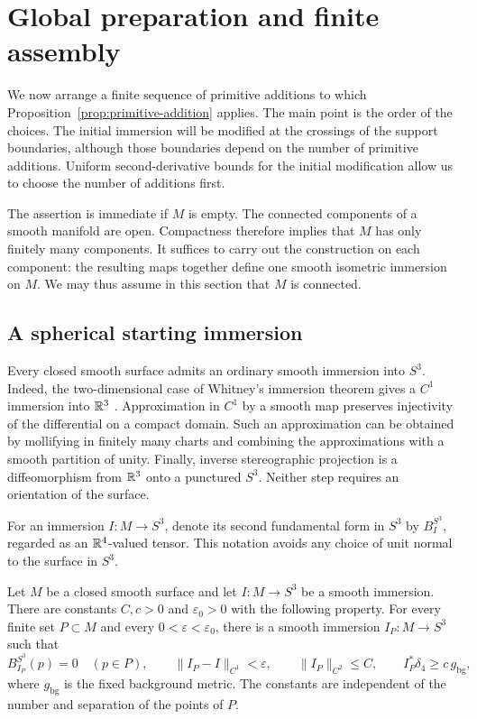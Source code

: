 \section{Global preparation and finite assembly}
\label{sec:global-construction}

We now arrange a finite sequence of primitive additions to which
Proposition~\ref{prop:primitive-addition} applies.  The main point is the order
of the choices.  The initial immersion will be modified at the crossings of
the support boundaries, although those boundaries depend on the number of
primitive additions.  Uniform second-derivative bounds for the initial
modification allow us to choose the number of additions first.

The assertion is immediate if $M$ is empty.  The connected components
of a smooth manifold are open.  Compactness
therefore implies that $M$ has only finitely many components.  It suffices
to carry out the construction on each component: the resulting maps
together define one smooth isometric immersion on $M$.  We may thus
assume in this section that $M$ is connected.

\subsection{A spherical starting immersion}

Every closed smooth surface admits an ordinary smooth immersion into $S^3$.
Indeed, the two-dimensional case of Whitney's immersion theorem gives a
$C^1$ immersion into $\mathbb{R}^3$ \cite[Theorem~8, p.~274]{Whitney1944}.  Approximation in $C^1$ by a
smooth map preserves injectivity of the differential on a compact domain.
Such an approximation can be obtained by mollifying in finitely many charts
and combining the approximations with a smooth partition of unity.  Finally,
inverse stereographic projection is a diffeomorphism from $\mathbb{R}^3$ onto a
punctured $S^3$.  Neither step requires an orientation of the surface.

For an immersion $I:M\to S^3$, denote its second fundamental form in $S^3$
by $B_I^{S^3}$, regarded as an $\mathbb{R}^4$-valued tensor.  This notation avoids any
choice of unit normal to the surface in $S^3$.

\begin{lemma}
\label{lem:spherical-preparation}
Let $M$ be a closed smooth surface and let $I:M\to S^3$ be a smooth
immersion.  There are constants $C,c>0$ and $\varepsilon_0>0$ with the
following property.  For every finite set $P\subset M$ and every
$0<\varepsilon<\varepsilon_0$, there is a smooth immersion
$I_P:M\to S^3$ such that
\[
 B_{I_P}^{S^3}(p)=0\quad(p\in P),\qquad
 \|I_P-I\|_{C^1}<\varepsilon,\qquad
 \|I_P\|_{C^2}\le C,
 \qquad I_P^*\delta_4\ge c\,g_{\mathrm{bg}},
\]
where $g_{\mathrm{bg}}$ is the fixed background metric.  The constants are
independent of the number and separation of the points of $P$.
\end{lemma}

